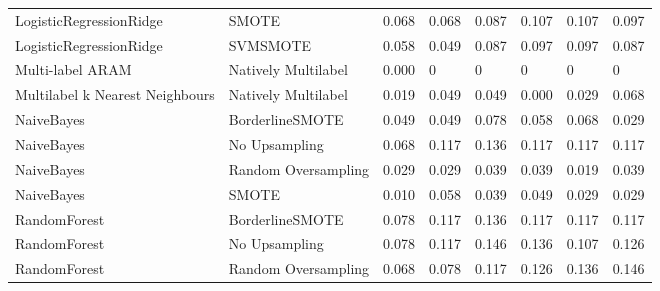 \begin{tabular}{llllllll}
        LogisticRegressionRidge &                         SMOTE & 0.068 &                     0.068 &                 0.087 &                  0.107 &                                   0.107 &    0.097 \\
        LogisticRegressionRidge &                      SVMSMOTE & 0.058 &                     0.049 &                 0.087 &                  0.097 &                                   0.097 &    0.087 \\
               Multi-label ARAM &           Natively Multilabel & 0.000 &                         0 &                     0 &                      0 &                                       0 &        0 \\
Multilabel k Nearest Neighbours &           Natively Multilabel & 0.019 &                     0.049 &                 0.049 &                  0.000 &                                   0.029 &    0.068 \\
                     NaiveBayes &               BorderlineSMOTE & 0.049 &                     0.049 &                 0.078 &                  0.058 &                                   0.068 &    0.029 \\
                     NaiveBayes &                 No Upsampling & 0.068 &                     0.117 &                 0.136 &                  0.117 &                                   0.117 &    0.117 \\
                     NaiveBayes &           Random Oversampling & 0.029 &                     0.029 &                 0.039 &                  0.039 &                                   0.019 &    0.039 \\
                     NaiveBayes &                         SMOTE & 0.010 &                     0.058 &                 0.039 &                  0.049 &                                   0.029 &    0.029 \\
                   RandomForest &               BorderlineSMOTE & 0.078 &                     0.117 &                 0.136 &                  0.117 &                                   0.117 &    0.117 \\
                   RandomForest &                 No Upsampling & 0.078 &                     0.117 &                 0.146 &                  0.136 &                                   0.107 &    0.126 \\
                   RandomForest &           Random Oversampling & 0.068 &                     0.078 &                 0.117 &                  0.126 &                                   0.136 &    0.146 \\

\end{tabular}
